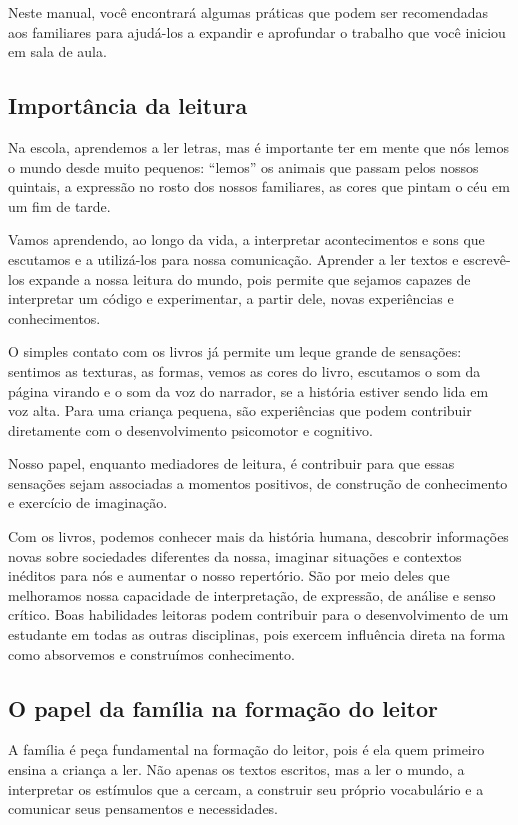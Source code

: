 \documentclass[11pt]{extarticle}
\begin{document}
Neste manual, você encontrará algumas práticas que podem ser 
recomendadas aos familiares para ajudá-los a expandir e aprofundar o trabalho 
que você iniciou em sala de aula.

\subsection{Importância da leitura}
Na escola, aprendemos a ler letras, mas é importante ter em mente que nós lemos o mundo desde muito pequenos: “lemos” os animais que passam pelos nossos 
quintais, a expressão no rosto dos nossos familiares, as cores que pintam o céu 
em um fim de tarde. 

Vamos aprendendo, ao longo da vida, a interpretar acontecimentos 
e sons que escutamos e a utilizá-los para nossa comunicação. Aprender a ler textos e 
escrevê-los expande a nossa leitura do mundo, pois permite que sejamos capazes de 
interpretar um código e experimentar, a partir dele, novas experiências e conhecimentos. 

O simples contato com os livros já permite um leque grande de sensações: 
sentimos as texturas, as formas, vemos as cores do livro, escutamos o som da página 
virando e o som da voz do narrador, se a história estiver sendo lida em voz alta. Para uma 
criança pequena, são experiências que podem contribuir diretamente com o desenvolvimento psicomotor 
e cognitivo. 

Nosso papel, enquanto mediadores de leitura, é contribuir para que essas 
sensações sejam associadas a momentos positivos, de construção de 
conhecimento e exercício de imaginação. 

Com os livros, podemos conhecer mais da história humana, descobrir informações 
novas sobre sociedades diferentes da nossa, imaginar situações e contextos inéditos 
para nós e aumentar o nosso repertório. São por meio deles que melhoramos nossa 
capacidade de interpretação, de expressão, de análise e senso crítico. Boas habilidades 
leitoras podem contribuir para o desenvolvimento de um estudante em todas as outras 
disciplinas, pois exercem influência direta na forma como absorvemos e 
construímos conhecimento.

\subsection{O papel da família na formação do leitor}
A família é peça fundamental na formação do leitor, pois é ela quem primeiro 
ensina a criança a ler. Não apenas os textos escritos, mas a ler o mundo, a 
interpretar os estímulos que a cercam, a construir seu próprio vocabulário e a 
comunicar seus pensamentos e necessidades.
\end{document}
